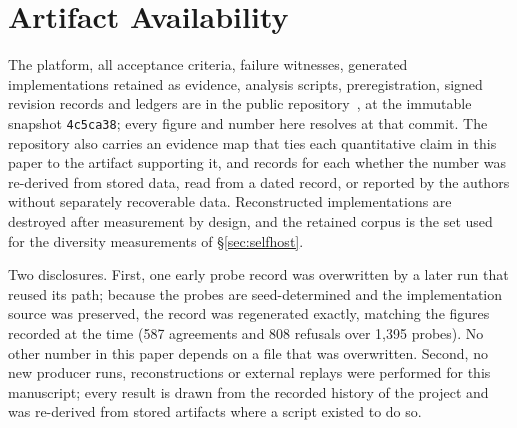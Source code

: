 \documentclass[10pt,twocolumn]{article}
\begin{document}
\balance
\section*{Artifact Availability}

The platform, all acceptance criteria, failure witnesses, generated
implementations retained as evidence, analysis scripts, preregistration,
signed revision records and ledgers are in the public
repository~\cite{reticuli}, at the immutable snapshot
\texttt{4c5ca38}; every figure and number here resolves at that commit.
The repository also carries an evidence map that ties each quantitative
claim in this paper to the artifact supporting it, and records for each
whether the number was re-derived from stored data, read from a dated
record, or reported by the authors without separately recoverable data. Reconstructed implementations are destroyed
after measurement by design, and the retained corpus is the set used for
the diversity measurements of \S\ref{sec:selfhost}.

Two disclosures. First, one early probe record was overwritten by a later
run that reused its path; because the probes are seed-determined and the
implementation source was preserved, the record was regenerated exactly,
matching the figures recorded at the time (587 agreements and 808
refusals over 1{,}395 probes). No other number in this paper depends on
a file that was overwritten. Second, no new producer runs, reconstructions
or external replays were performed for this manuscript; every result is
drawn from the recorded history of the project and was re-derived from
stored artifacts where a script existed to do so.





\end{document}
